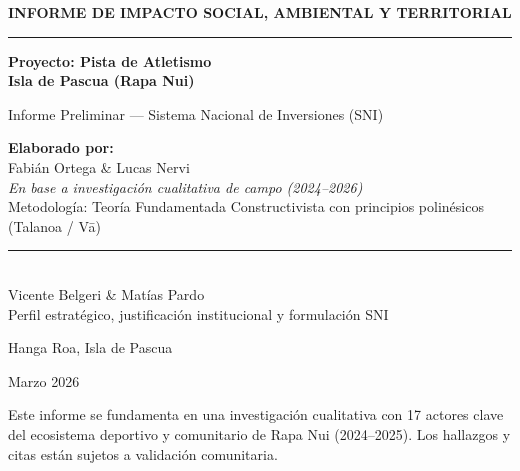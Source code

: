 \documentclass[12pt, a4paper]{article}
\begin{document}
\begin{titlepage}
  \centering
  \vspace*{2cm}
  {\Large\bfseries INFORME DE IMPACTO SOCIAL, AMBIENTAL Y TERRITORIAL\par}
  \vspace{0.5cm}
  {\rule{\linewidth}{1.5pt}\par}
  \vspace{0.8cm}
  {\LARGE\bfseries\color{primarygray}
    Proyecto: Pista de Atletismo\\[0.3cm]
    Isla de Pascua (Rapa Nui)\par}
  \vspace{1.5cm}
  {\large Informe Preliminar — Sistema Nacional de Inversiones (SNI)\par}
  \vspace{2cm}

  \begin{minipage}{0.9\textwidth}
    \centering
    {\normalsize\textbf{Elaborado por:}\\[0.4cm]
    Fabián Ortega \& Lucas Nervi\\[0.1cm]
    \textit{En base a investigación cualitativa de campo (2024--2026)}\\[0.1cm]
    {\footnotesize Metodología: Teoría Fundamentada Constructivista con principios polinésicos (Talanoa / Vā)}\\[0.4cm]
    \rule{0.5\linewidth}{0.3pt}\\[0.3cm]
    Vicente Belgeri \& Matías Pardo\\[0.1cm]
    {\footnotesize Perfil estratégico, justificación institucional y formulación SNI}\par}
  \end{minipage}

  \vspace{2cm}
  {\normalsize Hanga Roa, Isla de Pascua\par}
  {\normalsize Marzo 2026\par}

  \vfill
  {\footnotesize\color{gray}
    Este informe se fundamenta en una investigación cualitativa con 17 actores clave
    del ecosistema deportivo y comunitario de Rapa Nui (2024--2025).
    Los hallazgos y citas están sujetos a validación comunitaria.\par}
\end{titlepage}

\tableofcontents
\newpage

\end{document}
